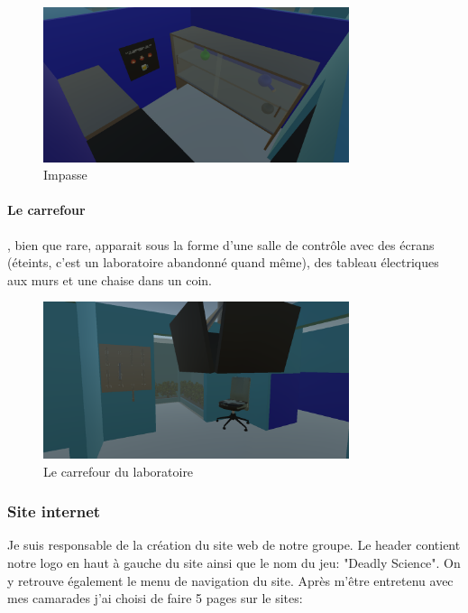 \documentclass{article}
\begin{document}
\begin{figure}[!ht]
    \centering
    \includegraphics[width=0.8\textwidth]{impasse.png}
    \caption{Impasse}
    \label{Impasse}
\end{figure}

\newpage
\paragraph{Le carrefour}\hspace{-0.2cm}, bien que rare, apparait sous la forme d'une salle de contrôle avec des écrans (éteints, c'est un laboratoire abandonné quand même), des tableau électriques aux murs et une chaise dans un coin.

\begin{figure}[!ht]
    \centering
    \includegraphics[width=0.8\textwidth]{carrefour.png}
    \caption{Le carrefour du laboratoire}
    \label{carrefour}
\end{figure}

\subsubsection{Site internet}
Je suis responsable de la création du site web de notre groupe. Le header contient notre logo en haut à gauche du site ainsi que le nom du jeu: "Deadly Science". On y retrouve également le menu de navigation du site. Après m'être entretenu avec mes camarades j'ai choisi de faire 5 pages sur le sites:
\end{document}
